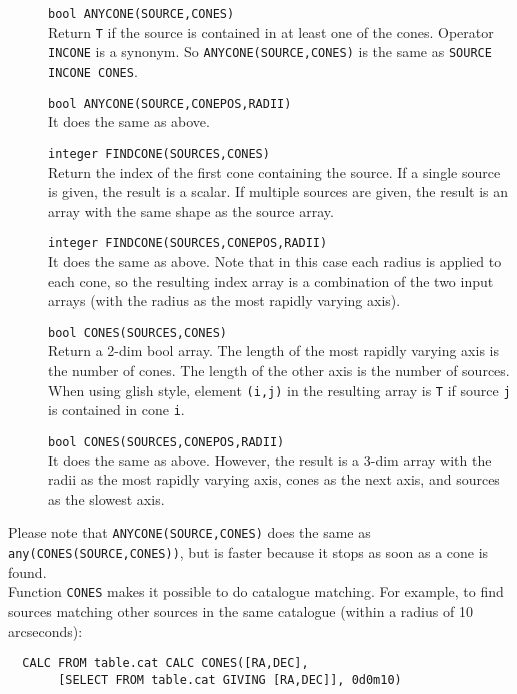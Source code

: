 \begin{description}
  \item[] \texttt{bool ANYCONE(SOURCE,CONES)}\\
       Return \texttt{T} if the source is contained in at least one of the cones.
       Operator \texttt{INCONE} is a synonym. So
       \texttt{ANYCONE(SOURCE,CONES)} is the same as
       \texttt{SOURCE INCONE CONES}.
  \item[] \texttt{bool ANYCONE(SOURCE,CONEPOS,RADII)}\\
       It does the same as above.
  \item[] \texttt{integer FINDCONE(SOURCES,CONES)}\\
       Return the index of the first cone containing the source.
       If a single source is given, the result is a scalar.
       If multiple sources are given, the result is an array with the
       same shape as the source array.
  \item[] \texttt{integer FINDCONE(SOURCES,CONEPOS,RADII)}\\
       It does the same as above. Note that in this case each radius is
       applied to each cone, so the resulting index array
       is a combination of the two input arrays
       (with the radius as the most rapidly varying axis).
  \item[] \texttt{bool CONES(SOURCES,CONES)}\\
       Return a 2-dim bool array. The length of the most rapidly
       varying axis is the
       number of cones. The length of the other axis is the number of
       sources. When using glish style, element \texttt{(i,j)}
       in the resulting array is \texttt{T}
       if source \texttt{j} is contained in cone \texttt{i}.
  \item[] \texttt{bool CONES(SOURCES,CONEPOS,RADII)}\\
       It does the same as above. However, the result is a 3-dim array
       with the radii as the most rapidly varying axis, cones as the
       next axis, and sources as the slowest axis.
\end{description}
Please note that \texttt{ANYCONE(SOURCE,CONES)} does the same as
\texttt{any(CONES(SOURCE,CONES))}, but is faster because it stops as
soon as a cone is found.
\\Function \texttt{CONES} makes it possible to do catalogue matching.
For example, to find sources matching other sources in the same
catalogue (within a radius of 10 arcseconds):
\begin{verbatim}
  CALC FROM table.cat CALC CONES([RA,DEC],
       [SELECT FROM table.cat GIVING [RA,DEC]], 0d0m10)
\end{verbatim}

